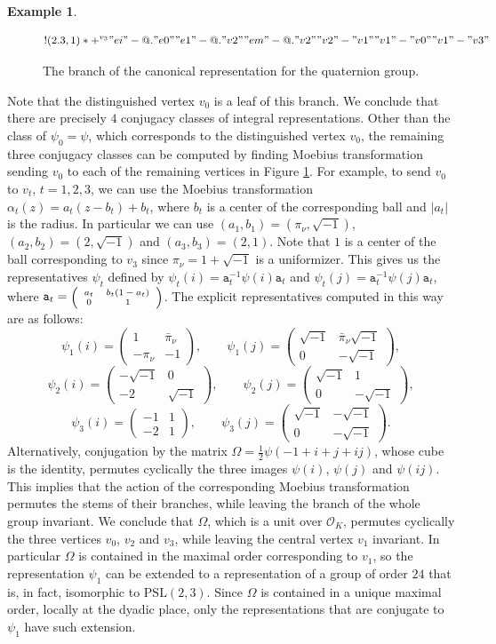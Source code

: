 \documentclass{article}
\theoremstyle{definition}
\newtheorem{ex}[Prop]{Example}
\theoremstyle{remark}
\newcommand\bmattrix[4]{\left(\begin{array}{cc}#1&#2\\#3&#4\end{array}\right)}
\newcommand\sbmattrix[4]{\textnormal{\scriptsize$\left(\begin{array}{cc}#1&#2\\#3&#4\end{array}\right)$\normalsize}}
\begin{document}
\begin{ex}
\begin{figure}
\[{!{(2.3,1) }*+{{}^{v_3}}
"ei"-@{.}"e0" "e1"-@{.}"v2" 
"em"-@{.}"v2" "v2"-"v1" "v1"-"v0"
"v1"-"v3"
    }\]
        \caption{The branch of the canonical representation for
        the quaternion group.}\label{f11}
    \end{figure}
        Note that the 
    distinguished vertex $v_0$ is a leaf of this
    branch. We conclude that there are precisely
    $4$ conjugacy classes of integral 
    representations. Other than the class of
    $\psi_0=\psi$, which corresponds to the 
    distinguished vertex $v_0$, the remaining
    three conjugacy classes can be computed
    by finding Moebius transformation sending
    $v_0$ to each of the remaining vertices in 
    Figure \ref{f11}. For example, to send
    $v_0$ to $v_t$, $t=1,2,3$, we can use the 
    Moebius transformation 
    $\alpha_t(z)=a_t(z-b_t)+b_t$, where $b_t$ is 
    a center of the corresponding ball 
    and $|a_t|$ is the radius. In particular we can use $(a_1,b_1)=(\pi_\nu,\sqrt{-1})$,
    $(a_2,b_2)=(2,\sqrt{-1})$ and 
    $(a_3,b_3)=(2,1)$. Note that $1$ is a center
    of the ball corresponding to $v_3$ since
    $\pi_\nu=1+\sqrt{-1}$ is a uniformizer.
    This gives us the representatives $\psi_t$
    defined by 
    $\psi_t(i)=\mathtt{a}_t^{-1}\psi(i)\mathtt{a}_t$
    and $\psi_t(j)=\mathtt{a}_t^{-1}\psi(j)\mathtt{a}_t$,
    where $\mathtt{a}_t=\sbmattrix {a_t}{b_t(1-a_t)}01$.
    The explicit representatives computed in this way are as follows:
    $$\psi_1(i)=\bmattrix 1{\bar\pi_\nu}{-\pi_\nu}{-1}, \qquad
    \psi_1(j)=
    \bmattrix {\sqrt{-1}}{\bar\pi_\nu\sqrt{-1}}
    0{-\sqrt{-1}},$$
      $$\psi_2(i)=
      \bmattrix {-\sqrt{-1}}0{-2}{\sqrt{-1}}, 
      \qquad
    \psi_2(j)=
    \bmattrix {\sqrt{-1}}10{-\sqrt{-1}},$$
      $$\psi_3(i)=\bmattrix {-1}1{-2}1, \qquad
    \psi_3(j)=
    \bmattrix {\sqrt{-1}}{-\sqrt{-1}}0
    {-\sqrt{-1}}.$$
    Alternatively, conjugation by the matrix
    $\Omega=\frac12\psi(-1+i+j+ij)$, whose 
    cube is the identity, permutes cyclically 
    the three images $\psi(i)$, $\psi(j)$ 
    and $\psi(ij)$. 
    This implies that the action of the 
    corresponding Moebius transformation permutes
    the stems of their branches, while leaving
    the branch of the whole group invariant.
    We conclude that $\Omega$, which is a unit 
    over $\mathcal{O}_K$, permutes cyclically
    the three vertices $v_0$, $v_2$ and $v_3$,
    while leaving the central vertex $v_1$
    invariant. In particular $\Omega$ is contained
    in the maximal order corresponding to $v_1$,
    so the representation $\psi_1$ can be 
    extended to a representation of a group of 
    order $24$ that is, in fact, isomorphic to
    $\mathrm{PSL}(2,3)$. Since $\Omega$ is 
    contained in a unique maximal order, locally at the
    dyadic place, only the representations that are conjugate to
    $\psi_1$ have such extension.
\end{ex}
\end{document}
